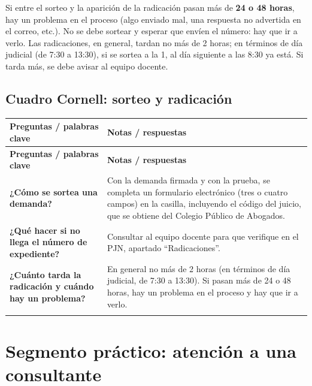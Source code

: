 \documentclass[12pt,oneside]{book}
\makeatletter
\newenvironment{cornell}{%
  \par\smallskip
  \begin{longtable}{@{}>{\raggedright\arraybackslash}p{0.28\textwidth}
                    >{\raggedright\arraybackslash}p{0.66\textwidth}@{}}
  \toprule
  \textbf{Preguntas / palabras clave} & \textbf{Notas / respuestas} \\
  \midrule
  \endfirsthead
  \toprule
  \textbf{Preguntas / palabras clave} & \textbf{Notas / respuestas} \\
  \midrule
  \endhead
}{%
  \bottomrule
  \end{longtable}
}
\newcommand{\cornellresumen}[1]{%
  \midrule
  \multicolumn{2}{@{}p{0.96\textwidth}@{}}{\textbf{Resumen:} #1} \\
}
\makeatother
\begin{document}
Si entre el sorteo y la aparición de la radicación pasan más de \textbf{24 o 48 horas}, hay un problema en el proceso (algo enviado mal, una respuesta no advertida en el correo, etc.). No se debe sortear y esperar que envíen el número: hay que ir a verlo. Las radicaciones, en general, tardan no más de 2 horas; en términos de día judicial (de 7:30 a 13:30), si se sortea a la 1, al día siguiente a las 8:30 ya está. Si tarda más, se debe avisar al equipo docente.


\section{Cuadro Cornell: sorteo y radicación}

\begin{cornell}
\textbf{¿Cómo se sortea una demanda?} &
Con la demanda firmada y con la prueba, se completa un formulario electrónico (tres o cuatro campos) en la casilla, incluyendo el código del juicio, que se obtiene del Colegio Público de Abogados. \\[0.6em]

\textbf{¿Qué hacer si no llega el número de expediente?} &
Consultar al equipo docente para que verifique en el PJN, apartado ``Radicaciones''. \\[0.6em]

\textbf{¿Cuánto tarda la radicación y cuándo hay un problema?} &
En general no más de 2 horas (en términos de día judicial, de 7:30 a 13:30). Si pasan más de 24 o 48 horas, hay un problema en el proceso y hay que ir a verlo. \\
\cornellresumen{Una vez firmada la demanda con su prueba, se sortea mediante un formulario electrónico con el código del juicio. La radicación debe verificarse en el PJN (Radicaciones, ``Juicio radicado''); si demora más de 24 o 48 horas, hay un problema.}
\end{cornell}

\chapter{Segmento práctico: atención a una consultante}
\end{document}
